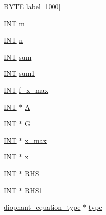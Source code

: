 \begin{DoxyCompactItemize}
\item 
\mbox{\hyperlink{galois_8h_ab6cc7b4aeb6ea31aba2b3fbfc83ff5e6}{B\+Y\+TE}} \mbox{\hyperlink{classdiophant_a5f8790fdf02bf65c8c783948f46af3bb}{label}} \mbox{[}1000\mbox{]}
\item 
\mbox{\hyperlink{galois_8h_a09fddde158a3a20bd2dcadb609de11dc}{I\+NT}} \mbox{\hyperlink{classdiophant_aa69645f9f75b13d51a58bdda260d9d50}{m}}
\item 
\mbox{\hyperlink{galois_8h_a09fddde158a3a20bd2dcadb609de11dc}{I\+NT}} \mbox{\hyperlink{classdiophant_a2dbedb80b802fc1539d8d64657dd2c38}{n}}
\item 
\mbox{\hyperlink{galois_8h_a09fddde158a3a20bd2dcadb609de11dc}{I\+NT}} \mbox{\hyperlink{classdiophant_ac19c24fb84014441d33d124192f918b4}{sum}}
\item 
\mbox{\hyperlink{galois_8h_a09fddde158a3a20bd2dcadb609de11dc}{I\+NT}} \mbox{\hyperlink{classdiophant_ae378b5517e44fcbe995f7727a1dc860d}{sum1}}
\item 
\mbox{\hyperlink{galois_8h_a09fddde158a3a20bd2dcadb609de11dc}{I\+NT}} \mbox{\hyperlink{classdiophant_ab148d75d8ec7b1ddc1a8e63bca19f9d5}{f\+\_\+x\+\_\+max}}
\item 
\mbox{\hyperlink{galois_8h_a09fddde158a3a20bd2dcadb609de11dc}{I\+NT}} $\ast$ \mbox{\hyperlink{classdiophant_ae7f0280b9d3e4c91ae0ce79ce2ad6b9b}{A}}
\item 
\mbox{\hyperlink{galois_8h_a09fddde158a3a20bd2dcadb609de11dc}{I\+NT}} $\ast$ \mbox{\hyperlink{classdiophant_a5ccf39f79396a12c1bb7de221f4f6900}{G}}
\item 
\mbox{\hyperlink{galois_8h_a09fddde158a3a20bd2dcadb609de11dc}{I\+NT}} $\ast$ \mbox{\hyperlink{classdiophant_a0cf4d936d782021b52016616ca02286c}{x\+\_\+max}}
\item 
\mbox{\hyperlink{galois_8h_a09fddde158a3a20bd2dcadb609de11dc}{I\+NT}} $\ast$ \mbox{\hyperlink{classdiophant_a1e722a7e3648efbcab62525e60026646}{x}}
\item 
\mbox{\hyperlink{galois_8h_a09fddde158a3a20bd2dcadb609de11dc}{I\+NT}} $\ast$ \mbox{\hyperlink{classdiophant_a5c00faf2141cf223fe05e168d49889a4}{R\+HS}}
\item 
\mbox{\hyperlink{galois_8h_a09fddde158a3a20bd2dcadb609de11dc}{I\+NT}} $\ast$ \mbox{\hyperlink{classdiophant_a7fe02dbb0940803281879c3339e83b55}{R\+H\+S1}}
\item 
\mbox{\hyperlink{galois_8h_a331aa0f3283349b42f6bab83e017cdc1}{diophant\+\_\+equation\+\_\+type}} $\ast$ \mbox{\hyperlink{classdiophant_a089f5e7dd94bc91819ebd3e6cce7ff76}{type}}

\end{DoxyCompactItemize}
